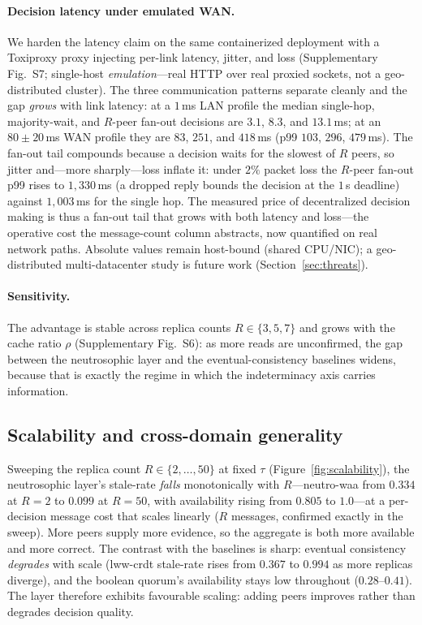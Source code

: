 \documentclass[11pt]{article}
\begin{document}
\paragraph{Decision latency under emulated WAN.} We harden the latency claim on the same containerized
deployment with a Toxiproxy proxy injecting per-link latency, jitter, and loss
(Supplementary Fig.~S7; single-host \emph{emulation}---real HTTP over real proxied sockets, not a
geo-distributed cluster). The three communication patterns separate cleanly and the gap \emph{grows}
with link latency: at a $1$\,ms LAN profile the median single-hop, majority-wait, and $R$-peer fan-out
decisions are $3.1$, $8.3$, and $13.1$\,ms; at an $80\pm20$\,ms WAN profile they are $83$, $251$, and
$418$\,ms (p99 $103$, $296$, $479$\,ms). The fan-out tail compounds because a decision waits for the
slowest of $R$ peers, so jitter and---more sharply---loss inflate it: under $2\%$ packet loss the
$R$-peer fan-out p99 rises to $1{,}330$\,ms (a dropped reply bounds the decision at the $1$\,s deadline)
against $1{,}003$\,ms for the single hop. The measured price of decentralized decision making is thus a
fan-out tail that grows with both latency and loss---the operative cost the message-count column
abstracts, now quantified on real network paths. Absolute values remain host-bound (shared CPU/NIC); a
geo-distributed multi-datacenter study is future work (Section~\ref{sec:threats}).

\paragraph{Sensitivity.} The advantage is stable across replica counts $R\in\{3,5,7\}$ and grows with
the cache ratio $\rho$ (Supplementary Fig.~S6): as more reads are unconfirmed, the gap between
the neutrosophic layer and the eventual-consistency baselines widens, because that is exactly the
regime in which the indeterminacy axis carries information.

\subsection{Scalability and cross-domain generality}
Sweeping the replica count $R\in\{2,\dots,50\}$ at fixed
$\tau$ (Figure~\ref{fig:scalability}), the neutrosophic layer's stale-rate \emph{falls} monotonically
with $R$---neutro-waa from $0.334$ at $R{=}2$ to $0.099$ at $R{=}50$, with availability rising from
$0.805$ to $1.0$---at a per-decision message cost that scales linearly ($R$ messages, confirmed exactly
in the sweep). More peers supply more evidence, so the aggregate is both more available and more correct.
The contrast with the baselines is sharp: eventual consistency \emph{degrades} with scale (lww-crdt
stale-rate rises from $0.367$ to $0.994$ as more replicas diverge), and the boolean quorum's availability
stays low throughout ($0.28$--$0.41$). The layer therefore exhibits favourable scaling: adding peers improves rather than degrades decision
quality.
\end{document}
